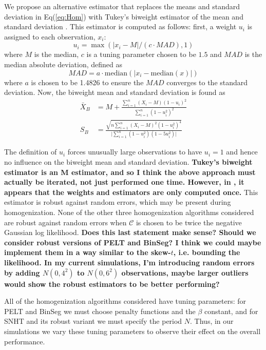 \documentclass[12pt]{article}
\begin{document}
\begin{doublespacing}
We propose an alternative estimator that replaces the means and standard deviation in Eq(\ref{eq:Hom}) with Tukey's biweight estimator of the mean and standard deviation \cite{hoaglin83}.  This estimator is computed as follows: first, a weight $u_i$ is assigned to each observation, $x_i$:
\begin{equation*}
	u_i = \max\left(\lvert x_i-M \rvert/(c \cdot MAD), 1 \right)
\end{equation*}
where $M$ is the median, $c$ is a tuning parameter chosen to be $1.5$ and $MAD$ is the median absolute deviation, defined as
\begin{equation*}
	MAD = a \cdot \mbox{median}( \lvert x_i - \mbox{median}(x) \rvert )
\end{equation*}
where $a$ is chosen to be 1.4826 to ensure the $MAD$ converges to the standard deviation.  Now, the biweight mean and standard deviation is found as
\begin{align*}
	\bar{X}_B &= M + \frac{\sum_{i=1}^n (X_i-M)(1-u_i)^2}{\sum_{i=1}^n (1-u_i^2)^2}\\
	S_B &= \frac{\sqrt{n \sum_{i=1}^n (X_i-M)^2(1-u_i^2)^4}}{\lvert \sum_{i=1}^n (1-u_i^2)(1-5 u_i^2)\rvert}
\end{align*}

The definition of $u_i$ forces unusually large observations to have $u_i=1$ and hence no influence on the biweight mean and standard deviation.  \textbf{Tukey's biweight estimator is an M estimator, and so I think the above approach must actually be iterated, not just performed one time.  However, in \cite{lanzante96}, it appears that the weights and estimators are only computed once.} This estimator is robust against random errors, which may be present during homogenization.  None of the other three homogenization algorithms considered are robust against random errors when $\mathcal{C}$ is chosen to be twice the negative Gaussian log likelihood. \textbf{Does this last statement make sense?  Should we consider robust versions of PELT and BinSeg?  I think we could maybe implement them in a way similar to the skew-$t$, i.e. bounding the likelihood.  In my current simulations, I'm introducing random errors by adding $N(0,4^2)$ to $N(0,6^2)$ observations, maybe larger outliers would show the robust estimators to be better performing?}

All of the homogenization algorithms considered have tuning parameters: for PELT and BinSeg we must choose penalty functions and the $\beta$ constant, and for SNHT and its robust variant we must specify the period $N$.  Thus, in our simulations we vary these tuning parameters to observe their effect on the overall performance.


\end{doublespacing}
\end{document}
